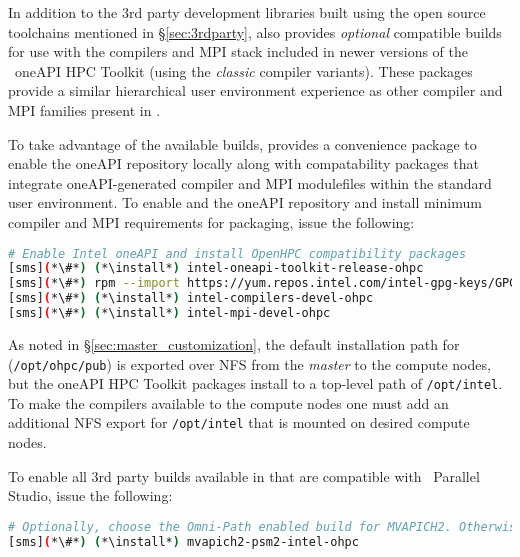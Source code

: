 In addition to the 3rd party development libraries built using the open source
toolchains mentioned in \S\ref{sec:3rdparty}, \OHPC{} also provides {\em
  optional} compatible builds for use with the compilers and MPI stack included
in newer versions of the \IntelR{}~oneAPI HPC Toolkit (using the {\em classic}
compiler variants).  These
packages provide a similar hierarchical user
environment experience as other compiler and MPI families present in \OHPC{}.

To take advantage of the available builds, \OHPC{} provides a convenience
package to enable the oneAPI repository locally along with compatability
packages that integrate oneAPI-generated compiler and MPI modulefiles within
the standard \OHPC{} user environment. To enable and the \IntelR{} oneAPI
repository and install minimum compiler and MPI requirements for \OHPC{}
packaging, issue the following:

\begin{lstlisting}[language=bash,keywords={},upquote=true,keepspaces]
# Enable Intel oneAPI and install OpenHPC compatibility packages
[sms](*\#*) (*\install*) intel-oneapi-toolkit-release-ohpc
[sms](*\#*) rpm --import https://yum.repos.intel.com/intel-gpg-keys/GPG-PUB-KEY-INTEL-SW-PRODUCTS.PUB
[sms](*\#*) (*\install*) intel-compilers-devel-ohpc
[sms](*\#*) (*\install*) intel-mpi-devel-ohpc
\end{lstlisting}


\begin{center}
\begin{tcolorbox}[]
As noted in \S\ref{sec:master_customization}, the default installation path for
\OHPC{} (\texttt{/opt/ohpc/pub}) is exported over NFS from the {\em master} to the 
compute nodes, but the \IntelR{} oneAPI HPC Toolkit packages install to a top-level path of 
\texttt{/opt/intel}. To make the \IntelR{} compilers available to the compute 
nodes one must add an additional NFS export
for \texttt{/opt/intel} that is mounted on desired compute nodes.
\end{tcolorbox}
\end{center}

\noindent To enable all 3rd party builds available in \OHPC{} that are compatible with
\IntelR{}~Parallel Studio, issue the following:


\begin{lstlisting}[language=bash,keywords={},upquote=true,keepspaces]
# Optionally, choose the Omni-Path enabled build for MVAPICH2. Otherwise, skip to retain IB variant
[sms](*\#*) (*\install*) mvapich2-psm2-intel-ohpc
\end{lstlisting}

